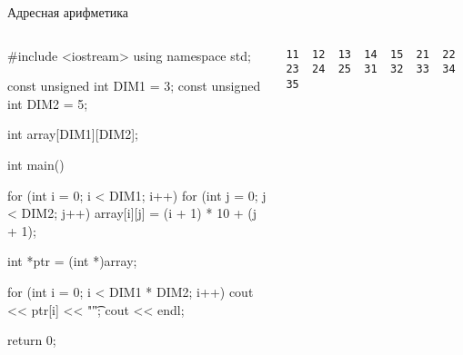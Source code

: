 \documentclass[
    9pt,
    hyperref={pdfencoding=unicode}
    ]{beamer}
\theoremstyle{definition}
\begin{document}
\begin{frame}[fragile]{Адресная арифметика}
    \footnotesize
    \begin{columns}
        \begin{column}{0.7\textwidth}
            \begin{cppcode}
                #include <iostream>        
                using namespace std;   
                
                const unsigned int DIM1 = 3;
                const unsigned int DIM2 = 5;
                
                int array[DIM1][DIM2];
                
                int main() {            
                    for (int i = 0; i < DIM1; i++) {
                        for (int j = 0; j < DIM2; j++) {
                            array[i][j] = (i + 1) * 10 + (j + 1);
                        }
                    }
                    
                    int *ptr = (int *)array;
                    
                    for (int i = 0; i < DIM1 * DIM2; i++) {
                        cout << ptr[i] << "\t";
                    }
                    cout << endl;
                    
                    return 0;
                }
            \end{cppcode}
        \end{column}
        \begin{column}{0.3\textwidth}
            \begin{verbatim}
11  12  13  14  15  21  22  23  24  25  31  32  33  34  35
            \end{verbatim}
        \end{column}
    \end{columns}
    
\end{frame}
\end{document}
